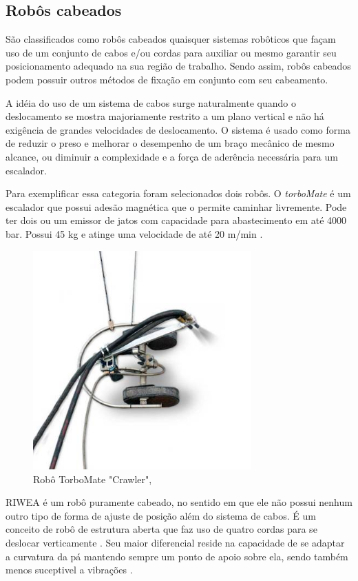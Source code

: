 \subsection{Robôs cabeados}
São classificados como robôs cabeados quaisquer sistemas robôticos que façam
uso de um conjunto de cabos e/ou cordas para auxiliar ou mesmo garantir seu
posicionamento adequado na sua região de trabalho. Sendo assim, robôs cabeados
podem possuir outros métodos de fixação em conjunto com seu cabeamento.

A idéia do uso de um sistema de cabos surge naturalmente quando o deslocamento
se mostra majoriamente restrito a um plano vertical e não há exigência de
grandes velocidades de deslocamento. O sistema é usado como forma de reduzir o
preso e melhorar o desempenho de um braço mecânico de mesmo alcance, ou diminuir a complexidade e
a força de aderência necessária para um escalador.

Para exemplificar essa categoria foram selecionados dois robôs. O
\textit{torboMate} é um escalador que possui adesão magnética que o
permite caminhar livremente. Pode ter dois ou um
emissor de jatos com capacidade para abastecimento em até 4000 bar. Possui 45 kg
e atinge uma velocidade de até 20 m/min \citep{torbo}.

\begin{figure}[ht]
	\centering
	\includegraphics[width=8.4cm]{sota/figs/cables/torbo}
	\caption{Robô TorboMate "Crawler", \cite{torbo}}
	\label{fig:cables:torbo}
\end{figure}

RIWEA é um robô puramente cabeado, no sentido em que ele não possui nenhum
outro tipo de forma de ajuste de posição além do sistema de cabos. É um
conceito de robô de estrutura aberta que faz uso de quatro cordas para se
deslocar verticamente \citep{jeon2012maintenance}. Seu maior diferencial reside
na capacidade de se adaptar a curvatura da pá mantendo sempre um ponto de apoio
sobre ela, sendo também menos suceptivel a vibrações \citep{riwea}.

